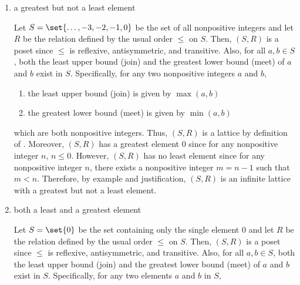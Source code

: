 \begin{enumerate}
\begin{enumerate}
\begin{subanswer}
      which are both nonnegative integers. Thus, $(S, R)$ is a lattice by definition of .\proofstep
      Moreover, $(S, R)$ has a least element $0$ since for any nonnegative integer $n$, $0 \leq n$.
      However, $(S, R)$ has no greatest element since for any nonnegative integer $n$, 
      there exists a nonnegative integer $m = n + 1$ such that $m > n$.\proofstep
      Therefore, by example and justification, $(S, R)$ is an infinite lattice with a least but not a greatest element.
    \end{subanswer}
    \item a greatest but not a least element
    \begin{subanswer}
      Let $S = \set{\ldots, -3, -2, -1, 0}$ be the set of all nonpositive integers and let $R$ be the relation defined by the usual order $\leq$ on $S$.
      Then, $(S, R)$ is a poset since $\leq$ is reflexive, antisymmetric, and transitive.
      Also, for all $a, b \in S$, both the least upper bound (join) and the greatest lower bound (meet) of $a$ and $b$ exist in $S$.
      Specifically, for any two nonpositive integers $a$ and $b$, 
      \begin{enumerate}
        \item the least upper bound (join) is given by $\max(a,b)$
        \item the greatest lower bound (meet) is given by $\min(a,b)$
      \end{enumerate}
      which are both nonpositive integers. Thus, $(S, R)$ is a lattice by definition of .\proofstep
      Moreover, $(S, R)$ has a greatest element $0$ since for any nonpositive integer $n$, $n \leq 0$.
      However, $(S, R)$ has no least element since for any nonpositive integer $n$, 
      there exists a nonpositive integer $m = n - 1$ such that $m < n$.\proofstep
      Therefore, by example and justification, $(S, R)$ is an infinite lattice with a greatest but not a least element.
    \end{subanswer}
    \item both a least and a greatest element
    \begin{subanswer}
      Let $S = \set{0}$ be the set containing only the single element $0$ and let $R$ be the relation defined by the usual order $\leq$ on $S$.
      Then, $(S, R)$ is a poset since $\leq$ is reflexive, antisymmetric, and transitive.
      Also, for all $a, b \in S$, both the least upper bound (join) and the greatest lower bound (meet) of $a$ and $b$ exist in $S$.
      Specifically, for any two elements $a$ and $b$ in $S$, 

\end{subanswer}
\end{enumerate}
\end{enumerate}
